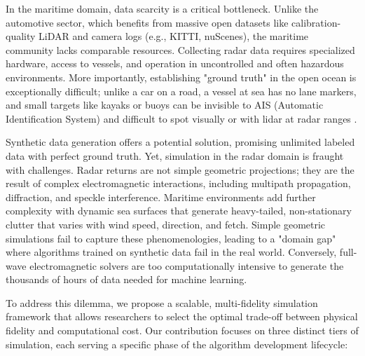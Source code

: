 \documentclass[conf]{new-aiaa}
\begin{document}
In the maritime domain, data scarcity is a critical bottleneck. Unlike the automotive sector, which benefits from massive open datasets like calibration-quality LiDAR and camera logs (e.g., KITTI, nuScenes), the maritime community lacks comparable resources. Collecting radar data requires specialized hardware, access to vessels, and operation in uncontrolled and often hazardous environments. More importantly, establishing "ground truth" in the open ocean is exceptionally difficult; unlike a car on a road, a vessel at sea has no lane markers, and small targets like kayaks or buoys can be invisible to AIS (Automatic Identification System) and difficult to spot visually or with lidar at radar ranges \cite{simon2018challenges}.

Synthetic data generation offers a potential solution, promising unlimited labeled data with perfect ground truth. Yet, simulation in the radar domain is fraught with challenges. Radar returns are not simple geometric projections; they are the result of complex electromagnetic interactions, including multipath propagation, diffraction, and speckle interference. Maritime environments add further complexity with dynamic sea surfaces that generate heavy-tailed, non-stationary clutter that varies with wind speed, direction, and fetch. Simple geometric simulations fail to capture these phenomenologies, leading to a "domain gap" where algorithms trained on synthetic data fail in the real world. Conversely, full-wave electromagnetic solvers are too computationally intensive to generate the thousands of hours of data needed for machine learning.

To address this dilemma, we propose a scalable, multi-fidelity simulation framework that allows researchers to select the optimal trade-off between physical fidelity and computational cost. Our contribution focuses on three distinct tiers of simulation, each serving a specific phase of the algorithm development lifecycle:
\end{document}
